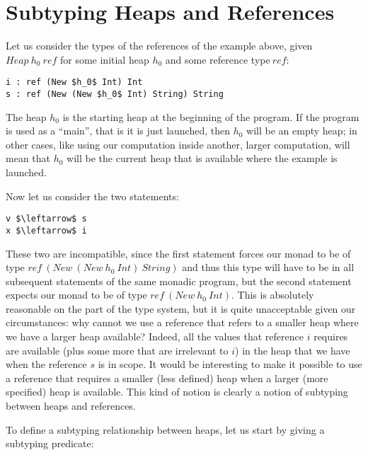 \documentclass[a4paper]{article}
\begin{document}

\noindent 
\section{Subtyping Heaps and References}

\noindent Let us consider the types of the references of the example above, given $Heap\ h_0\ ref$ for some initial heap $h_0$ and some reference type$\ ref$:

\begin{lstlisting}
i : ref (New $h_0$ Int) Int
s : ref (New (New $h_0$ Int) String) String
\end{lstlisting}

The heap $h_0$ is the starting heap at the beginning of the program. If the program is used as a ``main'', that is it is just launched, then $h_0$ will be an empty heap; in other cases, like using our computation inside another, larger computation, will mean that  $h_0$ will be the current heap that is available where the example is launched.

\noindent Now let us consider the two statements:

\begin{lstlisting}
v $\leftarrow$ s
x $\leftarrow$ i
\end{lstlisting}

These two are incompatible, since the first statement forces our monad to be of type $ref\ \left(New\ \left(New\ h_0\ Int\right)\ String\right)$ and thus this type will have to be in all subsequent statements of the same monadic program, but the second statement expects our monad to be of type $ref\ \left(New\ h_0\ Int\right)$. This is absolutely reasonable on the part of the type system, but it is quite unacceptable given our circumstances: why cannot we use a reference that refers to a smaller heap where we have a larger heap available? Indeed, all the values that reference $i$ requires are available (plus some more that are irrelevant to $i$) in the heap that we have when the reference $s$ is in scope. It would be interesting to make it possible to use a reference that requires a smaller (less defined) heap when a larger (more specified) heap is available. This kind of notion is clearly a notion of subtyping between heaps and references.

\noindent To define a subtyping relationship between heaps, let us start by giving a subtyping predicate:
\end{document}
